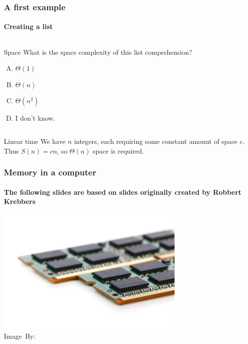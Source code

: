 \begin{frame}
	\frametitle{A first example}
	\framesubtitle{Creating a list}
	
	\begin{columns}
			
		\pause
		\begin{questionblock}{Space}
			What is the \alert{space} complexity of this list comprehension?
			\begin{enumerate}[A.]
				\item $\Theta(1)$
				\item $\Theta(n)$ 
				\item $\Theta(n^2)$
				\item I don't know.
			\end{enumerate}
		\end{questionblock}
	\end{columns}
	\pause
	\begin{answerblock}{Linear time}
		We have $n$ integers, each requiring some constant amount of space $c$. Thus $S(n) = cn$, so $\Theta(n)$ space is
		required.
	\end{answerblock}
\end{frame}

\begin{frame}
	\frametitle{Memory in a computer}
	\framesubtitle{The following slides are based on slides originally created by Robbert Krebbers}
\begin{center}
	\includegraphics[width=0.70\textwidth]{figures/ram.jpg}\\
	\hspace*{15pt}\hbox{\scriptsize Image By:}
\end{center}
\end{frame}


